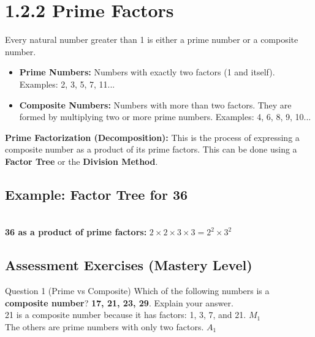 \documentclass[12pt, a4paper, oneside]{article}
\begin{document}
\section*{1.2.2 Prime Factors}

\begin{tcolorbox}[colback=lightgrey, colframe=primaryblue, title=\textbf{Concept Summary}, arc=5pt]
    Every natural number greater than 1 is either a prime number or a composite number.
    \begin{itemize}
        \item \textbf{Prime Numbers:} Numbers with exactly two factors (1 and itself). Examples: 2, 3, 5, 7, 11...
        \item \textbf{Composite Numbers:} Numbers with more than two factors. They are formed by multiplying two or more prime numbers. Examples: 4, 6, 8, 9, 10...
    \end{itemize}
    \textbf{Prime Factorization (Decomposition):} This is the process of expressing a composite number as a product of its prime factors. This can be done using a \textbf{Factor Tree} or the \textbf{Division Method}.
\end{tcolorbox}

\subsection*{Example: Factor Tree for 36}
\begin{center}
\\ \medskip
\textbf{36 as a product of prime factors:} $2 \times 2 \times 3 \times 3 = 2^2 \times 3^2$
\end{center}

\subsection*{Assessment Exercises (Mastery Level)}

\begin{solvingbox}{Question 1 (Prime vs Composite)}
Which of the following numbers is a \textbf{composite number}? \textbf{17, 21, 23, 29}. Explain your answer. \\
21 is a composite number because it has factors: 1, 3, 7, and 21. \hfill $M_1$ \\
The others are prime numbers with only two factors. \hfill $A_1$
\end{solvingbox}
\end{document}
